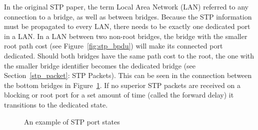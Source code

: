 In the original STP paper\cite{perlman85}, the term Local Area Network (LAN) referred to any connection to a bridge, as well as between bridges.
Because the STP information must be propagated to every LAN, there needs to be exactly one dedicated port in a LAN.
In a LAN between two non-root bridges, the bridge with the smaller root path cost (see Figure~\ref{fig:stp_bpdu}) will make its connected port dedicated.
Should both bridges have the same path cost to the root, the one with the smaller bridge identifier becomes the dedicated bridge (see Section~\ref{stp_packet}: STP Packets).
This can be seen in the connection between the bottom bridges in Figure~\ref{fig:port_states}.
If no superior STP packets are received on a blocking or root port for a set amount of time (called the forward delay) it transitions to the dedicated state.
\begin{figure}[h]
    \centering
    \caption{An example of STP port states}
    \label{fig:port_states}
\end{figure}

